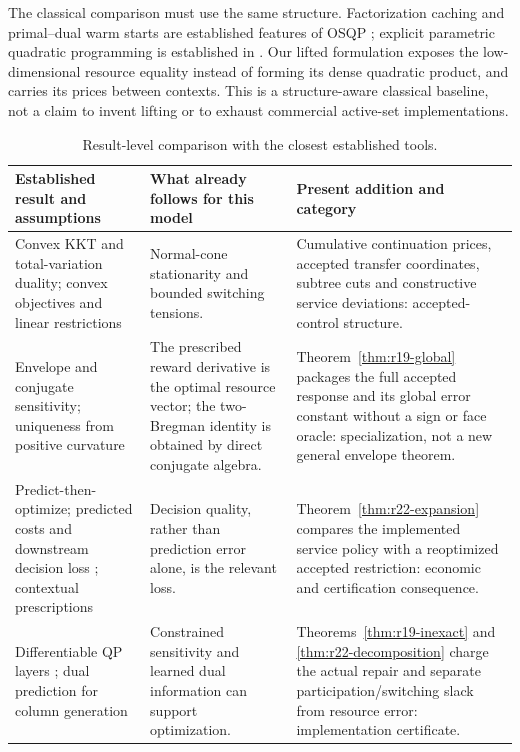 \documentclass[11pt,letterpaper]{article}
\theoremstyle{definition}
\newcommand{\1}{\mathbf 1}
\begin{document}
The classical comparison must use the same structure. Factorization caching and primal--dual warm starts are established features of OSQP \citep{Stellato2020}; explicit parametric quadratic programming is established in \citet{Bemporad2002}. Our lifted formulation exposes the low-dimensional resource equality instead of forming its dense quadratic product, and carries its prices between contexts. This is a structure-aware classical baseline, not a claim to invent lifting or to exhaust commercial active-set implementations.

\begin{table}[tbp]\centering\small
\caption{Result-level comparison with the closest established tools.}
\label{tab:r22-novelty}
\begin{tabular}{p{}p{}p{}}
\toprule
Established result and assumptions & What already follows for this model & Present addition and category\\
\midrule
Convex KKT and total-variation duality; convex objectives and linear restrictions \citep{BoydVandenberghe2004,TibshiraniTaylor2011}
& Normal-cone stationarity and bounded switching tensions.
& Cumulative continuation prices, accepted transfer coordinates, subtree cuts and constructive service deviations: accepted-control structure.\\
Envelope and conjugate sensitivity; uniqueness from positive curvature \citep{BoydVandenberghe2004}
& The prescribed reward derivative is the optimal resource vector; the two-Bregman identity is obtained by direct conjugate algebra.
& Theorem~\ref{thm:r19-global} packages the full accepted response and its global error constant without a sign or face oracle: specialization, not a new general envelope theorem.\\
Predict-then-optimize; predicted costs and downstream decision loss \citep{ElmachtoubGrigas2022}; contextual prescriptions \citep{BertsimasKallus2020}
& Decision quality, rather than prediction error alone, is the relevant loss.
& Theorem~\ref{thm:r22-expansion} compares the implemented service policy with a reoptimized accepted restriction: economic and certification consequence.\\
Differentiable QP layers \citep{AmosKolter2017}; dual prediction for column generation \citep{KraulSeizingerBrunner2023}
& Constrained sensitivity and learned dual information can support optimization.
& Theorems~\ref{thm:r19-inexact} and \ref{thm:r22-decomposition} charge the actual repair and separate participation/switching slack from resource error: implementation certificate.\\

\end{tabular}
\end{table}
\end{document}
